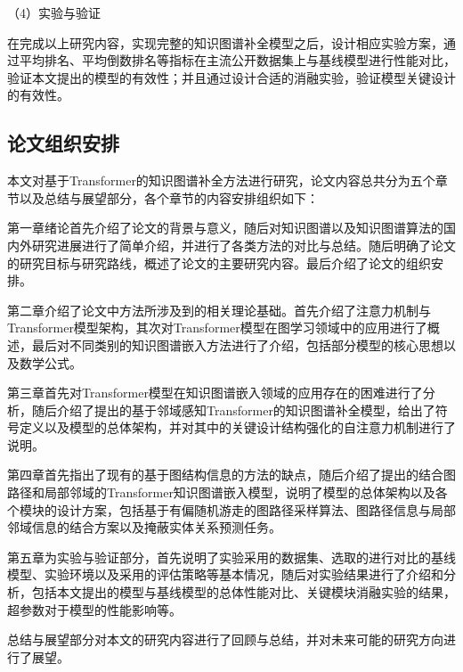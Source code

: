（4）实验与验证

在完成以上研究内容，实现完整的知识图谱补全模型之后，设计相应实验方案，通过平均排名、平均倒数排名等指标在主流公开数据集上与基线模型进行性能对比，验证本文提出的模型的有效性；并且通过设计合适的消融实验，验证模型关键设计的有效性。

\subsection{论文组织安排}
本文对基于Transformer的知识图谱补全方法进行研究，论文内容总共分为五个章节以及总结与展望部分，各个章节的内容安排组织如下：

第一章绪论首先介绍了论文的背景与意义，随后对知识图谱以及知识图谱算法的国内外研究进展进行了简单介绍，并进行了各类方法的对比与总结。随后明确了论文的研究目标与研究路线，概述了论文的主要研究内容。最后介绍了论文的组织安排。

第二章介绍了论文中方法所涉及到的相关理论基础。首先介绍了注意力机制与Transformer模型架构，其次对Transformer模型在图学习领域中的应用进行了概述，最后对不同类别的知识图谱嵌入方法进行了介绍，包括部分模型的核心思想以及数学公式。

第三章首先对Transformer模型在知识图谱嵌入领域的应用存在的困难进行了分析，随后介绍了提出的基于邻域感知Transformer的知识图谱补全模型，给出了符号定义以及模型的总体架构，并对其中的关键设计结构强化的自注意力机制进行了说明。

第四章首先指出了现有的基于图结构信息的方法的缺点，随后介绍了提出的结合图路径和局部邻域的Transformer知识图谱嵌入模型，说明了模型的总体架构以及各个模块的设计方案，包括基于有偏随机游走的图路径采样算法、图路径信息与局部邻域信息的结合方案以及掩蔽实体关系预测任务。

第五章为实验与验证部分，首先说明了实验采用的数据集、选取的进行对比的基线模型、实验环境以及采用的评估策略等基本情况，随后对实验结果进行了介绍和分析，包括本文提出的模型与基线模型的总体性能对比、关键模块消融实验的结果，超参数对于模型的性能影响等。

总结与展望部分对本文的研究内容进行了回顾与总结，并对未来可能的研究方向进行了展望。